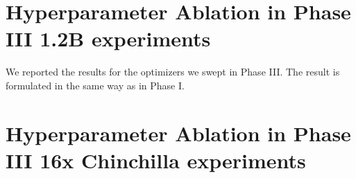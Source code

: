\section{Hyperparameter Ablation in Phase III 1.2B experiments}
\label{app:detailed_experiments_3}

We reported the results for the optimizers we swept in Phase III. The result is formulated in the same way as in Phase I.







\section{Hyperparameter Ablation in Phase III 16x Chinchilla experiments}
\label{app:detailed_experiments_4}






